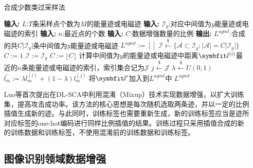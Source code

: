 {	\begin{breakablealgorithm}
		\caption{合成少数类过采样法}\label{alg:smotepolulate}
		\begin{algorithmic}[1]
			\Statex \textbf{输入:} $L$:$T$条采样点个数为$M$的能量迹或电磁迹
			\Statex \textbf{输入:} $\mathcal I_y$:对应中间值为$y$能量迹或电磁迹的索引
			\Statex \textbf{输入:} $n$:最近点的个数
			\Statex \textbf{输入:} $C$:数据增强数量的比例
			\Statex \textbf{输出:} $L^{agmt}$:合成的共$C\vert\mathcal I_y\vert$条中间值为$y$能量迹或电磁迹
			\State $L^{agmt}:=[]$
			\State $\mathcal I\stackrel{\$}\gets\{\mathcal A\subset \mathcal I_y:\vert\mathcal A\vert=C\vert\mathcal I_y\vert\}$
			\State $C:=1$
			\Else
			\State $\mathcal I:=\mathcal I_y$
			\State $C:=\lfloor C\rfloor$
			\EndIf
			\State 计算中间值为$y$的能量迹或电磁迹中距离$\Vector {l^{(i)}}$最近的$n$条能量迹或电磁迹的索引，索引集合记为$\mathcal J$
			\State $j\stackrel{\$}\gets\mathcal J$
			\State $\lambda\stackrel{\$}\gets U(0,1)$
			\State $l^\prime_m:=\lambda l^{(i)}_m+(1-\lambda)l^{(j)}_m$
			\EndFor
			\State 将$\Vector l^\prime$加入到$L^{agmt}$中
			\EndFor
			\EndFor
			\State \Return $L^{agmt}$
		\end{algorithmic}
	\end{breakablealgorithm}
	
	Luo等\citep{Luo21}首次提出在DL-SCA中利用混淆（Mixup）技术实现数据增强，以扩大训练集，提高攻击成功率。该方法的核心思想是每次随机选取两条迹，并以一定的比例插值生成新的迹。与此同时，训练标签也需要重新生成，新的训练标签应当是迹所对应标签的one-hot编码进行同样比例插值的结果。训练过程只采用插值合成的新的训练数据和训练标签，不使用混淆前的训练数据和训练标签。
%	
	\subsection{图像识别领域数据增强}
	
}

